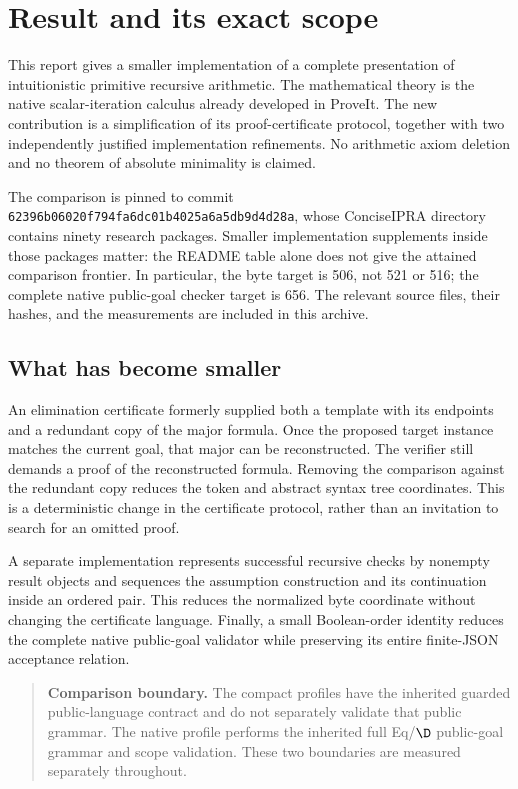 \section{Result and its exact scope}

This report gives a smaller implementation of a complete presentation of
intuitionistic primitive recursive arithmetic. The mathematical theory is
the native scalar-iteration calculus already developed in ProveIt. The new
contribution is a simplification of its proof-certificate protocol, together
with two independently justified implementation refinements. No arithmetic
axiom deletion and no theorem of absolute minimality is claimed.

The comparison is pinned to commit
\texttt{62396b06020f794fa6dc01b4025a6a5db9d4d28a}, whose ConciseIPRA
directory contains ninety research packages. Smaller implementation
supplements inside those packages matter: the README table alone does not
give the attained comparison frontier.\cite{upstream} In particular, the byte target is
506, not 521 or 516; the complete native public-goal checker target is 656.
The relevant source files, their hashes, and the measurements are included
in this archive.

\subsection{What has become smaller}

An elimination certificate formerly supplied both a template with its
endpoints and a redundant copy of the major formula. Once the proposed
target instance matches the current goal, that major can be reconstructed.
The verifier still demands a proof of the reconstructed formula. Removing
the comparison against the redundant copy reduces the token and abstract
syntax tree coordinates. This is a deterministic change in the certificate
protocol, rather than an invitation to search for an omitted proof.

A separate implementation represents successful recursive checks by
nonempty result objects and sequences the assumption construction and its
continuation inside an ordered pair. This reduces the normalized byte
coordinate without changing the certificate language. Finally, a small
Boolean-order identity reduces the complete native public-goal validator
while preserving its entire finite-JSON acceptance relation.

\begin{quote}
\textbf{Comparison boundary.} The compact profiles have the inherited
guarded public-language contract and do not separately validate that
public grammar. The native profile performs the inherited full Eq/$\D$
public-goal grammar and scope validation. These two boundaries are measured
separately throughout.
\end{quote}

